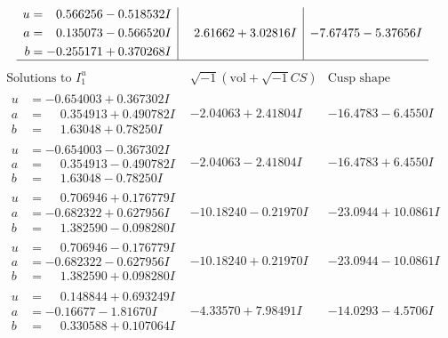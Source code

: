 \documentclass[1p]{elsarticle_modified}
\theoremstyle{definition}
\newcommand{\I}{\sqrt{-1}}
\begin{document}
$$\begin{array}{c|c|c}
\begin{aligned}
u &= \phantom{-}0.566256 - 0.518532 I \\
a &= \phantom{-}0.135073 - 0.566520 I \\
b &= -0.255171 + 0.370268 I\end{aligned}
 & \phantom{-}2.61662 + 3.02816 I & -7.67475 - 5.37656 I\\
 \hline 
 \end{array}$$\newpage$$\begin{array}{c|c|c}  
\text{Solutions to }I^u_{1}& \I (\text{vol} + \sqrt{-1}CS) & \text{Cusp shape}\\
 \hline 
\begin{aligned}
u &= -0.654003 + 0.367302 I \\
a &= \phantom{-}0.354913 + 0.490782 I \\
b &= \phantom{-}1.63048 + 0.78250 I\end{aligned}
 & -2.04063 + 2.41804 I & -16.4783 - 6.4550 I \\ \hline\begin{aligned}
u &= -0.654003 - 0.367302 I \\
a &= \phantom{-}0.354913 - 0.490782 I \\
b &= \phantom{-}1.63048 - 0.78250 I\end{aligned}
 & -2.04063 - 2.41804 I & -16.4783 + 6.4550 I \\ \hline\begin{aligned}
u &= \phantom{-}0.706946 + 0.176779 I \\
a &= -0.682322 + 0.627956 I \\
b &= \phantom{-}1.382590 - 0.098280 I\end{aligned}
 & -10.18240 - 0.21970 I & -23.0944 + 10.0861 I \\ \hline\begin{aligned}
u &= \phantom{-}0.706946 - 0.176779 I \\
a &= -0.682322 - 0.627956 I \\
b &= \phantom{-}1.382590 + 0.098280 I\end{aligned}
 & -10.18240 + 0.21970 I & -23.0944 - 10.0861 I \\ \hline\begin{aligned}
u &= \phantom{-}0.148844 + 0.693249 I \\
a &= -0.16677 - 1.81670 I \\
b &= \phantom{-}0.330588 + 0.107064 I\end{aligned}
 & -4.33570 + 7.98491 I & -14.0293 - 4.5706 I \\ \hline\begin{aligned}

\end{aligned}
\end{array}$$
\end{document}

